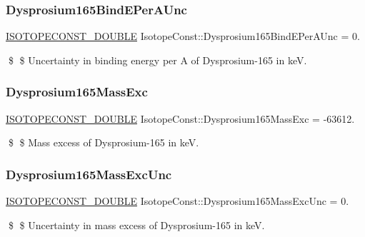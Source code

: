 \subsubsection{\texorpdfstring{Dysprosium165\+Bind\+E\+Per\+A\+Unc}{Dysprosium165BindEPerAUnc}}
{\footnotesize\ttfamily \mbox{\hyperlink{group___isotope_const-_macros_ga8f45a7272ce02c0b4c65c44636ed719a}{I\+S\+O\+T\+O\+P\+E\+C\+O\+N\+S\+T\+\_\+\+D\+O\+U\+B\+LE}} Isotope\+Const\+::\+Dysprosium165\+Bind\+E\+Per\+A\+Unc = 0.}

\$ \$ Uncertainty in binding energy per A of Dysprosium-\/165 in keV. \mbox{\label{group___isotope_const-_dysprosium-_dy165_ga959dca90a3dde0df308403a84a196e8e}} 
\subsubsection{\texorpdfstring{Dysprosium165\+Mass\+Exc}{Dysprosium165MassExc}}
{\footnotesize\ttfamily \mbox{\hyperlink{group___isotope_const-_macros_ga8f45a7272ce02c0b4c65c44636ed719a}{I\+S\+O\+T\+O\+P\+E\+C\+O\+N\+S\+T\+\_\+\+D\+O\+U\+B\+LE}} Isotope\+Const\+::\+Dysprosium165\+Mass\+Exc = -\/63612.}

\$ \$ Mass excess of Dysprosium-\/165 in keV. \mbox{\label{group___isotope_const-_dysprosium-_dy165_ga1abab731cee912ad931a7b4d8d7f4bf2}} 
\subsubsection{\texorpdfstring{Dysprosium165\+Mass\+Exc\+Unc}{Dysprosium165MassExcUnc}}
{\footnotesize\ttfamily \mbox{\hyperlink{group___isotope_const-_macros_ga8f45a7272ce02c0b4c65c44636ed719a}{I\+S\+O\+T\+O\+P\+E\+C\+O\+N\+S\+T\+\_\+\+D\+O\+U\+B\+LE}} Isotope\+Const\+::\+Dysprosium165\+Mass\+Exc\+Unc = 0.}

\$ \$ Uncertainty in mass excess of Dysprosium-\/165 in keV. \mbox{\label{group___isotope_const-_dysprosium-_dy165_ga9212e32e962ef9e78d63535951c712ea}} 
